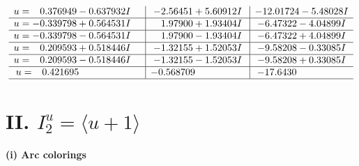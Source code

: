 \documentclass[1p]{elsarticle_modified}
\theoremstyle{definition}
\begin{document}
$$\begin{array}{c|c|c}
\begin{aligned}
u &= \phantom{-}0.376949 - 0.637932 I\end{aligned}
 & -2.56451 + 5.60912 I & -12.01724 - 5.48028 I \\ \hline\begin{aligned}
u &= -0.339798 + 0.564531 I\end{aligned}
 & \phantom{-}1.97900 + 1.93404 I & -6.47322 - 4.04899 I \\ \hline\begin{aligned}
u &= -0.339798 - 0.564531 I\end{aligned}
 & \phantom{-}1.97900 - 1.93404 I & -6.47322 + 4.04899 I \\ \hline\begin{aligned}
u &= \phantom{-}0.209593 + 0.518446 I\end{aligned}
 & -1.32155 + 1.52053 I & -9.58208 - 0.33085 I \\ \hline\begin{aligned}
u &= \phantom{-}0.209593 - 0.518446 I\end{aligned}
 & -1.32155 - 1.52053 I & -9.58208 + 0.33085 I \\ \hline\begin{aligned}
u &= \phantom{-}0.421695\phantom{ +0.000000I}\end{aligned}
 & -0.568709\phantom{ +0.000000I} & -17.6430\phantom{ +0.000000I}\\
 \hline 
 \end{array}$$\newpage\newpage\renewcommand{\arraystretch}{1}
\centering \section*{II. $I^u_{2}= \langle u+1 \rangle$}
\flushleft \textbf{(i) Arc colorings}\\
\end{document}
